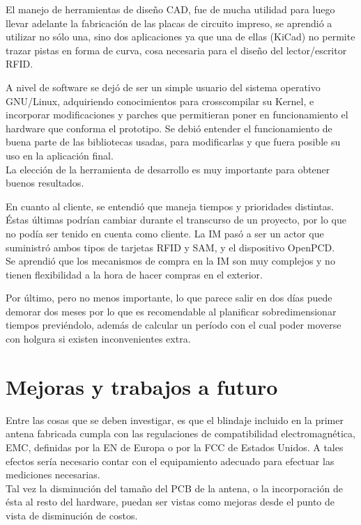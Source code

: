 \bigskip
El manejo de herramientas de diseño CAD, fue de mucha utilidad para luego
llevar adelante la fabricación de las placas de circuito impreso, se aprendió a utilizar
no sólo una, sino dos aplicaciones ya que una de ellas (KiCad) no permite trazar
pistas en forma de curva, cosa necesaria para el diseño del lector/escritor RFID.

\bigskip
A nivel de software se dejó de ser un simple usuario del sistema operativo
GNU/Linux, adquiriendo conocimientos para crosscompilar su Kernel, e incorporar
modificaciones y parches que permitieran poner en funcionamiento el hardware
que conforma el prototipo. Se debió entender el funcionamiento de buena parte
de las bibliotecas usadas, para modificarlas y que fuera posible su uso en la 
aplicación final.\\
La elección de la herramienta de desarrollo es muy importante para obtener buenos resultados.

\bigskip
En cuanto al cliente, se entendió que maneja tiempos y prioridades distintas. Éstas últimas
podrían cambiar durante el transcurso de un proyecto, por lo que no podía ser 
tenido en cuenta como cliente. La IM pasó a ser un actor que suministró ambos tipos de
tarjetas RFID y SAM, y el dispositivo OpenPCD. \\
Se aprendió que los mecanismos de compra en la IM son muy complejos y no tienen flexibilidad
a la hora de hacer compras en el exterior.

\bigskip
Por último, pero no menos importante, lo que parece salir en dos días puede demorar dos meses por lo que es recomendable al planificar sobredimensionar tiempos previéndolo, además de calcular un período con el cual poder moverse con holgura si existen inconvenientes extra.



\section{Mejoras y trabajos a futuro}
Entre las cosas que se deben investigar, es que el blindaje incluido en la 
primer antena fabricada cumpla con las regulaciones de compatibilidad 
electromagnética, EMC, definidas por la EN de Europa o por la FCC de Estados 
Unidos. A tales efectos sería necesario contar con el equipamiento adecuado
para efectuar las mediciones necesarias.\\
Tal vez la disminución del tamaño del PCB de la antena, o la incorporación
de ésta al resto del hardware, puedan ser vistas como mejoras desde el 
punto de vista de disminución de costos.


